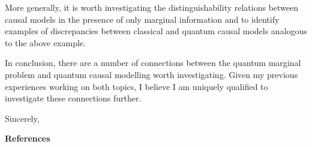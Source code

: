 \documentclass[12pt]{letter}
\begin{document}
\begin{letter}
More generally, it is worth investigating the distinguishability relations between causal models in the presence of only marginal information and to identify examples of discrepancies between classical and quantum causal models analogous to the above example.

In conclusion, there are a number of connections between the quantum marginal problem and quantum causal modelling worth investigating. Given my previous experiences working on both topics, I believe I am uniquely qualified to investigate these connections further.

\closing{Sincerely,}


\textbf{References}
\printbibliography[heading=none]{}


\end{letter}
\end{document}
